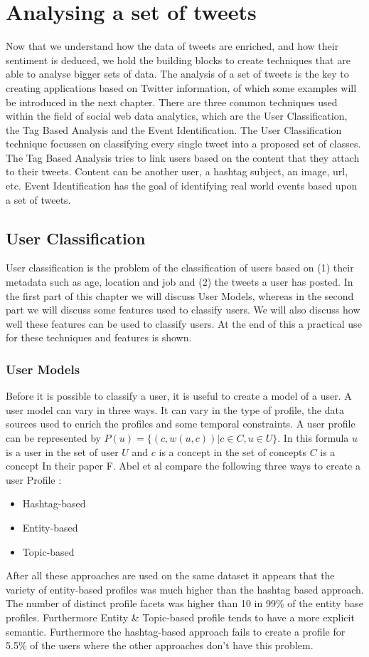 \documentclass{article}
\begin{document}
\section*{Analysing a set of tweets}

Now that we understand how the data of tweets are enriched, and how their sentiment is deduced, we hold the building blocks to create techniques that are able
to analyse bigger sets of data. The analysis of a set of tweets is the key to creating applications based on Twitter information, of which some examples
will be introduced in the next chapter. There are three common techniques used within the field of social web data analytics, which are the User Classification,
the Tag Based Analysis and the Event Identification. The User Classification technique focussen on classifying every single tweet into a proposed set of classes.
The Tag Based Analysis tries to link users based on the content that they attach to their tweets. Content can be another user, a hashtag subject, an image, url, etc.
Event Identification has the goal of identifying real world events based upon a set of tweets.

\subsection{User Classification}
User classification is the problem of the classification of users based on (1) their metadata such as age, location and job and (2) the tweets a user has posted. In the first part of this chapter we will discuss User Models, whereas in the second part we will discuss some features used to classify users. We will also discuss how well these features can be used to classify users. At the end of this a practical use for these techniques and features is shown. 
\subsubsection*{User Models}
Before it is possible to classify a user, it is useful to create a model of a user. A user model can vary in three ways. It can vary in the type of profile, the data sources used to enrich the profiles and some temporal constraints. A user profile can be represented by $P(u) = \{(c, w(u,c))| c \in C, u \in U\}$. In this formula $u$ is a user in the set of user $U$ and $c$ is a concept in the set of concepts $C$ is a concept In their paper F. Abel et al compare the following three ways to create a user Profile \cite{usermodel}:
\begin{itemize}
\item Hashtag-based
\item Entity-based
\item Topic-based
\end{itemize}
After all these approaches are used on the same dataset it appears that the variety of entity-based profiles was much higher than the hashtag based approach. The number of distinct profile facets was higher than 10 in 99\% of the entity base profiles. Furthermore Entity \& Topic-based profile tends to have a more explicit semantic.  \cite{usermodel} Furthermore the hashtag-based approach fails to create a profile for 5.5\% of the users where the other approaches don't have this problem. 
\end{document}
